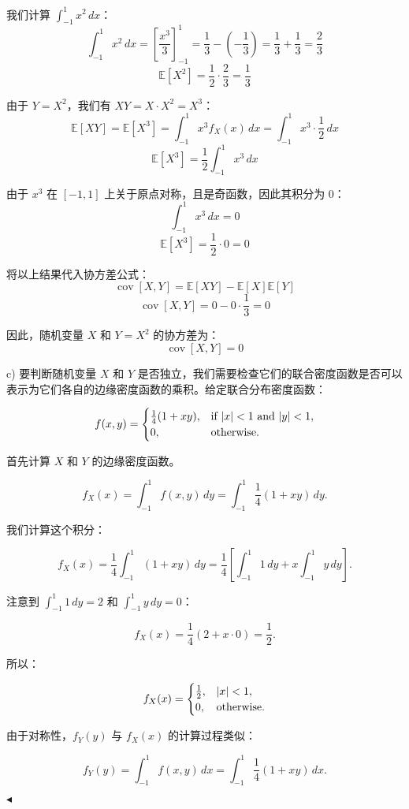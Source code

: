 \documentclass[11pt]{article}
\newenvironment{question}[2][Question]{\begin{trivlist}
\item[\hskip \labelsep {\bfseries #1}\hskip \labelsep {\bfseries #2.}]}{\hfill$\blacktriangleleft$\end{trivlist}}
\newcommand\E{\mathbb{E}}
\newcommand{\cov}{\operatorname{cov}}
\begin{document}
\begin{question}{2 (30') (独立性)}
我们计算 \(\int_{-1}^{1} x^2 \, dx\)：
\[
\int_{-1}^{1} x^2 \, dx = \left[ \frac{x^3}{3} \right]_{-1}^{1} = \frac{1}{3} - \left( -\frac{1}{3} \right) = \frac{1}{3} + \frac{1}{3} = \frac{2}{3}
\]
\[
\E[X^2] = \frac{1}{2} \cdot \frac{2}{3} = \frac{1}{3}
\]

由于 \( Y = X^2 \)，我们有 \( XY = X \cdot X^2 = X^3 \)：
\[
\E[XY] = \E[X^3] = \int_{-1}^{1} x^3 f_X(x) \, dx = \int_{-1}^{1} x^3 \cdot \frac{1}{2} \, dx
\]
\[
\E[X^3] = \frac{1}{2} \int_{-1}^{1} x^3 \, dx
\]

由于 \( x^3 \) 在 \([-1, 1]\) 上关于原点对称，且是奇函数，因此其积分为 0：
\[
\int_{-1}^{1} x^3 \, dx = 0
\]
\[
\E[X^3] = \frac{1}{2} \cdot 0 = 0
\]

将以上结果代入协方差公式：
\[
\cov[X, Y] = \E[XY] - \E[X]\E[Y]
\]
\[
\cov[X, Y] = 0 - 0 \cdot \frac{1}{3} = 0
\]

因此，随机变量 \( X \) 和 \( Y = X^2 \) 的协方差为：
\[
\cov[X, Y] = 0
\]


c) 
要判断随机变量 \(X\) 和 \(Y\) 是否独立，我们需要检查它们的联合密度函数是否可以表示为它们各自的边缘密度函数的乘积。给定联合分布密度函数：

\[
f(x, y) = \begin{cases}
\frac{1}{4}(1 + xy), & \text{if } \abs{x} < 1 \text{ and } \abs{y} < 1, \\
0, & \text{otherwise}.
\end{cases}
\]

首先计算 \(X\) 和 \(Y\) 的边缘密度函数。


\[
f_X(x) = \int_{-1}^{1} f(x, y) \, dy = \int_{-1}^{1} \frac{1}{4}(1 + xy) \, dy.
\]

我们计算这个积分：

\[
f_X(x) = \frac{1}{4} \int_{-1}^{1} (1 + xy) \, dy = \frac{1}{4} \left[ \int_{-1}^{1} 1 \, dy + x \int_{-1}^{1} y \, dy \right].
\]

注意到 \(\int_{-1}^{1} 1 \, dy = 2\) 和 \(\int_{-1}^{1} y \, dy = 0\)：

\[
f_X(x) = \frac{1}{4} \left( 2 + x \cdot 0 \right) = \frac{1}{2}.
\]

所以：

\[
f_X(x) = \begin{cases}
\frac{1}{2}, & \abs{x} < 1, \\
0, & \text{otherwise}.
\end{cases}
\]


由于对称性，\( f_Y(y) \) 与 \( f_X(x) \) 的计算过程类似：

\[
f_Y(y) = \int_{-1}^{1} f(x, y) \, dx = \int_{-1}^{1} \frac{1}{4}(1 + xy) \, dx.
\]


\end{question}
\end{document}
